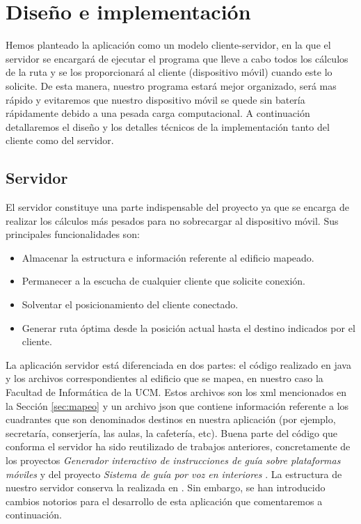 \chapter{Diseño e implementación}
\label{cap:diseñoeimplementación}


Hemos planteado la aplicación como un modelo cliente-servidor, en la que el servidor se encargará de ejecutar el programa que lleve a cabo todos los cálculos de la ruta y se los proporcionará al cliente (dispositivo móvil) cuando este lo solicite. De esta manera, nuestro programa estará mejor organizado, será mas rápido y evitaremos que nuestro dispositivo móvil se quede sin batería rápidamente debido a una pesada carga computacional. A continuación detallaremos el diseño y los detalles técnicos de la implementación tanto del cliente como del servidor.


\section{Servidor}
El servidor constituye una parte indispensable del proyecto ya que se encarga de realizar los cálculos más pesados para no sobrecargar al dispositivo móvil. Sus principales funcionalidades son:
\begin{itemize}
	\item Almacenar la estructura e información referente al edificio mapeado.
	\item Permanecer a la escucha de cualquier cliente que solicite conexión.
	\item Solventar el posicionamiento del cliente conectado.
	\item Generar ruta óptima desde la posición actual hasta el destino indicados por el cliente.
\end{itemize} 

La aplicación servidor está diferenciada en dos partes: el código realizado en java y los archivos correspondientes al edificio que se mapea, en nuestro caso la Facultad de Informática de la UCM. Estos archivos son los xml mencionados en la Sección \ref{sec:mapeo} y un archivo json que contiene información referente a los cuadrantes que son denominados destinos en nuestra aplicación (por ejemplo, secretaría, conserjería, las aulas, la cafetería, etc). 
Buena parte del código que conforma el servidor ha sido reutilizado de trabajos anteriores, concretamente de los proyectos \textit{Generador interactivo de instrucciones de guía sobre plataformas móviles} \citep{TFGguia} y del proyecto \textit{Sistema de guía por voz en interiores} \citep{TFGMariana}. La estructura de nuestro servidor conserva la realizada en \cite{TFGguia}. Sin embargo, se han introducido cambios notorios para el desarrollo de esta aplicación que comentaremos a continuación.

